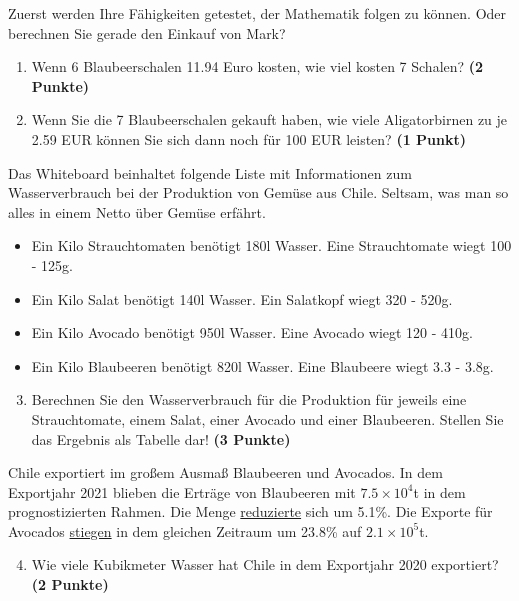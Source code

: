 \documentclass[a4paper, 9pt]{scrartcl}\usepackage[]{graphicx}\usepackage[]{xcolor}
\begin{document}
Zuerst werden Ihre Fähigkeiten getestet, der Mathematik folgen zu können. Oder berechnen Sie gerade den Einkauf von Mark?\\

\begin{enumerate}
\item Wenn 6 Blaubeerschalen 11.94 Euro kosten,  wie viel kosten 7 Schalen? \textbf{(2 Punkte)}
\item Wenn Sie die 7 Blaubeerschalen gekauft haben, wie viele Aligatorbirnen zu je 2.59 EUR können Sie sich dann noch für 100 EUR leisten? \textbf{(1 Punkt)}
\end{enumerate}

Das Whiteboard beinhaltet folgende Liste mit Informationen zum Wasserverbrauch bei der Produktion von Gemüse aus Chile. Seltsam, was man so alles in einem Netto über Gemüse erfährt.
  
\begin{itemize}[noitemsep]
\item Ein Kilo Strauchtomaten benötigt 180l Wasser. Eine Strauchtomate wiegt 100 - 125g.
\item Ein Kilo Salat benötigt 140l Wasser. Ein Salatkopf wiegt 320 - 520g.
\item Ein Kilo Avocado benötigt 950l Wasser. Eine Avocado wiegt 120 - 410g.
\item Ein Kilo Blaubeeren benötigt 820l Wasser. Eine Blaubeere wiegt 3.3 - 3.8g.
\end{itemize}

\begin{enumerate}
  \setcounter{enumi}{2}
\item Berechnen Sie den Wasserverbrauch für die Produktion für jeweils eine Strauchtomate, einem Salat, einer Avocado und einer Blaubeeren. Stellen Sie das Ergebnis als Tabelle dar! \textbf{(3 Punkte)}
\end{enumerate}

Chile exportiert im großem Ausmaß Blaubeeren und Avocados. In dem Exportjahr 2021 blieben die Erträge von Blaubeeren mit \ensuremath{7.5\times 10^{4}}t in dem prognostizierten Rahmen. Die Menge \underline{reduzierte} sich um 5.1\%. Die Exporte für Avocados \underline{stiegen} in dem gleichen Zeitraum um 23.8\% auf \ensuremath{2.1\times 10^{5}}t.

\begin{enumerate}
  \setcounter{enumi}{3}
\item Wie viele Kubikmeter Wasser hat Chile in dem Exportjahr 2020 exportiert? \textbf{(2 Punkte)}
\end{enumerate}
\end{document}
